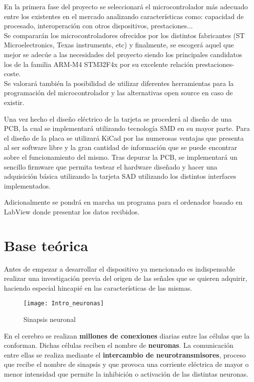 En la primera fase del proyecto se seleccionará el microcontrolador más adecuado entre los existentes en el mercado analizando características como: capacidad de procesado, interoperación con otros dispositivos, prestaciones...
\\Se compararán los microcontroladores ofrecidos por los distintos fabricantes (ST Microelectronics, Texas instruments, etc) y finalmente, se escogerá aquel que mejor se adecúe a las necesidades del proyecto siendo los principales candidatos los de la familia ARM-M4 STM32F4x por su excelente relación prestaciones-coste.
\\Se valorará también la posibilidad de utilizar diferentes herramientas para la programación del microcontrolador y las alternativas open source en caso de existir.

Una vez hecho el diseño eléctrico de la tarjeta se procederá al diseño de una PCB, la cual se implementará utilizando tecnología SMD en su mayor parte. Para el diseño de la placa se utilizará KiCad por las numerosas ventajas que presenta al ser software libre y la gran cantidad de información que se puede encontrar sobre el funcionamiento del mismo.
Tras depurar la PCB, se implementará un sencillo firmware que permita testear el hardware diseñado y hacer una adquisición básica utilizando la tarjeta SAD utilizando los distintos interfaces implementados.

Adicionalmente se pondrá en marcha un programa para el ordenador basado en LabView donde presentar los datos recibidos.

\section{Base teórica\label{sec:Base_teorica}}


Antes de empezar a desarrollar el dispositivo ya mencionado es indispensable realizar una investigación previa del origen de las señales que se quieren adquirir, haciendo especial hincapié en las características de las mismas.

\begin{wrapfigure}[14]{R}{8cm}
    \centering
    \texttt{[image: Intro\_neuronas]}
    \caption{Sinapsis neuronal \cite{wikipedia}}
    \label{fig:Intro_neuronas}

\end{wrapfigure}
En el cerebro se realizan \textbf{millones de conexiones} diarias entre las células que la conforman. Dichas células reciben el nombre de \textbf{neuronas}. La comunicación entre ellas se realiza mediante el \textbf{intercambio de neurotransmisores}, proceso que recibe el nombre de sinapsis y que provoca una corriente eléctrica de mayor o menor intensidad que permite la inhibición o activación de las distintas neuronas. 

